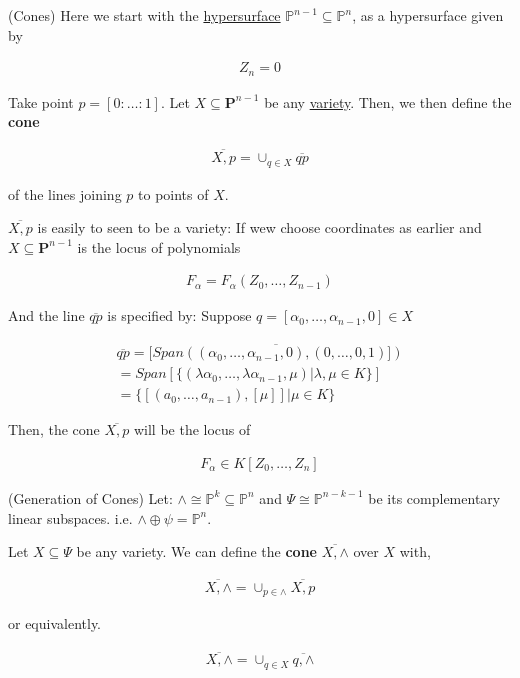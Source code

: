 \documentclass[Total.tex]{subfiles}
\begin{document}
		\begin{example}
			(Cones) Here we start with the \underline{hypersurface} $\mathbb{P}^{n-1}\subseteq \mathbb{P}^n$, as a hypersurface given by
			
			\begin{gather*}
				Z_n=0
			\end{gather*}
			
			Take point $p=[0:\dots:1]$. Let $X\subseteq \mathbf{P}^{n-1}$ be any \underline{variety}. Then, we then define the \textbf{cone}
			
			\begin{gather*}
				\overline{X,p}=\cup_{q\in X}\overline{qp}
			\end{gather*}
			
			of the lines joining $p$ to points of $X$.
			
			$\overline{X,p}$ is easily to seen to be a variety: If wew choose coordinates as earlier and $X\subseteq \mathbf{P}^{n-1}$ is the locus of polynomials
			
			\begin{gather*}
				F_\alpha=F_\alpha(Z_0,\dots,Z_{n-1})
			\end{gather*}
			
			And the line $\overline{qp}$ is specified by: Suppose $q=[\alpha_0,\dots,\alpha_{n-1},0]\in X$
			
			\begin{gather*}
				\overline{qp}=\overline{[Span((\alpha_0,\dots,\alpha_{n-1},0),(0,\dots,0,1)])}\\
				=Span[\{(\lambda \alpha_0,\dots,\lambda \alpha_{n-1},\mu)|\lambda,\mu\in K\}]\\
				=\{[(a_0,\dots,a_{n-1}),[\mu]]|\mu\in K\}
			\end{gather*}
			
			Then, the cone $\overline{X,p}$ will be the locus of 
			
			\begin{gather*}
				F_\alpha\in K[Z_0,\dots,Z_n]
			\end{gather*}
		\end{example}
		
		\begin{Def}
			\label{Classical-Algebra-Projections}(Generation of Cones) Let: $\wedge\cong \mathbb{P}^k\subseteq \mathbb{P}^n$ and $\Psi\cong \mathbb{P}^{n-k-1}$ be its complementary linear subspaces. i.e. $\wedge\oplus \psi=\mathbb{P}^n$.
			
			Let $X\subseteq \Psi$ be any variety. We can define the \textbf{cone} $\overline{X,\wedge}$ over $X$ with,
			
			\begin{gather*}
				\overline{X,\wedge}=\cup_{p\in \wedge} \overline{X,p} 
			\end{gather*}
			
			or equivalently.
			
			\begin{gather*}
				\overline{X,\wedge}=\cup_{q\in X} \overline{q,\wedge}
			\end{gather*}
		\end{Def}
		
\end{document}
